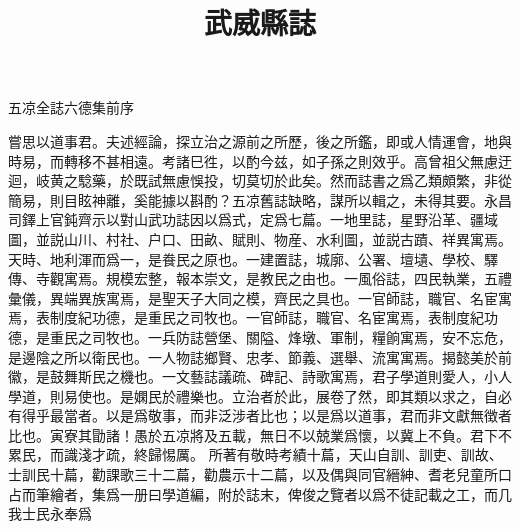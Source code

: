 \documentclass[五凉全誌六德集]{ltc-guji}
\title{武威縣誌}
\begin{document}
\begin{正文}
五凉全誌六德集前序
\begin{段落}[indent=2]
嘗思以道事 君。夫述經論，探立治之源前之所歷，後之所鑑，即或人情運會，地與時易，而轉移不甚相遠。考諸巳徃，以酌今兹，如子孫之則效乎。高曾祖父無慮迂迴，岐黄之騐藥，於既試無慮悞投，切莫切於此矣。然而誌書之爲乙類頗繁，非從簡易，則目眩神離，奚能據以斟酌？五凉舊誌缺略，謀所以輯之，未得其要。永昌司鐸上官鈍齊示以對山武功誌因以爲式，定爲七萹。一地里誌，星野沿革、疆域圖，並説山川、村社、户口、田畝、賦則、物産、水利圖，並説古蹟、祥異寓焉。天時、地利渾而爲一，是飬民之原也。一建置誌，城廓、公署、壇壝、學校、驛傳、寺觀寓焉。規模宏整，報本崇文，是教民之由也。一風俗誌，四民執業，五禮彙儀，異端異族寓焉，是 聖天子大同之模，齊民之具也。一官師誌，職官、名宦寓焉，表制度紀功德，是重民之司牧也。一官師誌，職官、名宦寓焉，表制度紀功德，是重民之司牧也。一兵防誌營堡、關隘、烽墩、軍制，糧餉寓焉，安不忘危，是邊陰之所以衛民也。一人物誌鄉賢、忠孝、節義、選舉、流寓寓焉。揭懿美於前徽，是鼓舞斯民之機也。一文藝誌議疏、碑記、詩歌寓焉，君子學道則愛人，小人學道，則易使也。是嫻民於禮樂也。立治者於此，展卷了然，即其類以求之，自必有得乎最當者。以是爲敬事，而非泛涉者比也；以是爲以道事， 君而非文獻無徴者比也。寅寮其勖諸！愚於五凉將及五載，無日不以兢業爲懷，以冀上不負。 君下不累民，而識淺才疏，終歸惕厲。
所著有敬時考績十萹，天山自訓、訓吏、訓故、士訓民十萹，勸課歌三十二萹，勸農示十二萹，以及偶與同官縉紳、耆老兒童所口占而筆繪者，集爲一册曰學道編，附於誌末，俾俊之覽者以爲不徒記載之工，而几我士民永奉爲
\end{段落}

\end{正文}
\end{document}
